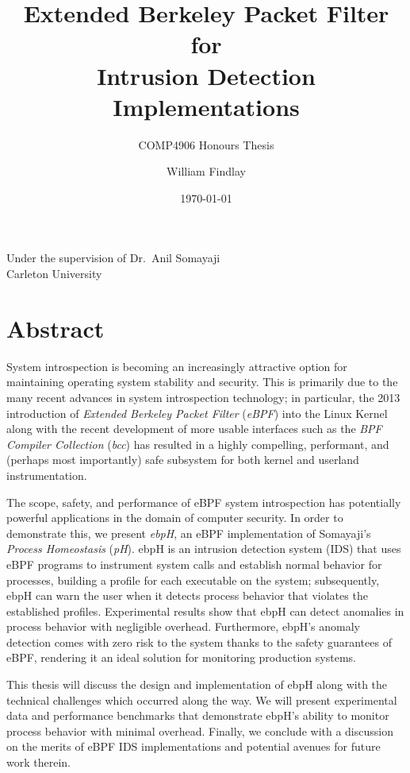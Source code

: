 \documentclass[
  12pt]{findlay}
\title{Extended Berkeley Packet Filter for\\
Intrusion Detection Implementations}
\subtitle{COMP4906 Honours Thesis}
\author{William Findlay}
\date{\today}
\begin{document}
\maketitle

\pagestyle{fancy}

\thispagestyle{empty}

\begin{center}
    \large
    \vfill
    Under the supervision of Dr.\ Anil Somayaji\\
    Carleton University
    \vfill
\end{center}

\onehalfspacing

\clearpage
{}
\section*{Abstract}

System introspection is becoming an increasingly attractive option for
maintaining operating system stability and security. This is primarily
due to the many recent advances in system introspection technology; in
particular, the 2013 introduction of \emph{Extended Berkeley Packet
Filter} (\emph{eBPF}) into the Linux Kernel
\autocite{starovoitov13,starovoitov14} along with the recent development
of more usable interfaces such as the \emph{BPF Compiler Collection}
(\emph{bcc}) \autocite{bcc} has resulted in a highly compelling,
performant, and (perhaps most importantly) safe subsystem for both
kernel and userland instrumentation.

The scope, safety, and performance of eBPF system introspection has
potentially powerful applications in the domain of computer security. In
order to demonstrate this, we present \emph{ebpH}, an eBPF
implementation of Somayaji's \autocite{soma02} \emph{Process
Homeostasis} (\emph{pH}). ebpH is an intrusion detection system (IDS)
that uses eBPF programs to instrument system calls and establish normal
behavior for processes, building a profile for each executable on the
system; subsequently, ebpH can warn the user when it detects process
behavior that violates the established profiles. Experimental results
show that ebpH can detect anomalies in process behavior with negligible
overhead. Furthermore, ebpH's anomaly detection comes with zero risk to
the system thanks to the safety guarantees of eBPF, rendering it an
ideal solution for monitoring production systems.

This thesis will discuss the design and implementation of ebpH along
with the technical challenges which occurred along the way. We will
present experimental data and performance benchmarks that demonstrate
ebpH's ability to monitor process behavior with minimal overhead.
Finally, we conclude with a discussion on the merits of eBPF IDS
implementations and potential avenues for future work therein.
\end{document}
